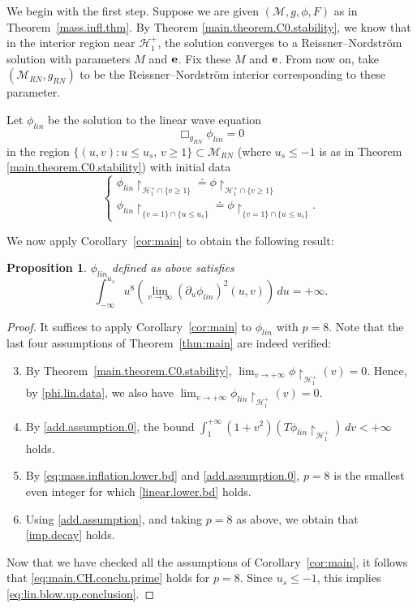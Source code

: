 \documentclass[10pt, reqno]{amsart}
\newtheorem{proposition}[theorem]{Proposition}
\theoremstyle{definition}
\theoremstyle{remark}
\numberwithin{equation}{section}
\newcommand{\rd}{\partial}
\newcommand{\0}{\emptyset}
\newcommand{\calH}{\mathcal H}
\newcommand{\EH}{\calH^{+}}
\begin{document}
We begin with the first step. Suppose we are given $(\mathcal M, g, \phi, F)$ as in Theorem~\ref{mass.infl.thm}. By Theorem \ref{main.theorem.C0.stability}, we know that in the interior region near $\EH_1$, the solution converges to a Reissner--Nordstr\"om solution with parameters $M$ and ${\bf e}$. Fix these $M$ and ${\bf e}$. From now on, take $(\mathcal M_{RN}, g_{RN})$ to be the Reissner--Nordstr\"om interior corresponding to these parameter.

Let $\phi_{lin}$ be the solution to the linear wave equation 
\begin{equation}\label{eq:phi.lin.wave}
\Box_{g_{RN}}\phi_{lin}=0
\end{equation}
in the region $\{(u,v): u\leq u_s,\,v\geq 1\}\subset \mathcal M_{RN}$ (where $u_s\leq -1$ is as in Theorem \ref{main.theorem.C0.stability}) with initial data 
\begin{equation}\label{phi.lin.data}
\begin{cases}
\phi_{lin}\restriction_{\EH_1\cap \{v\geq 1\}} \doteq \phi\restriction_{\EH_1 \cap \{v\geq 1\}}\\
\phi_{lin}\restriction_{\{v=1\}\cap \{u\leq u_s\}} \doteq \phi\restriction_{\{v=1\}\cap \{u\leq u_s\}}.
\end{cases}
\end{equation}



We now apply Corollary~\ref{cor:main} to obtain the following result:
\begin{proposition}\label{lin.blow.up}
$\phi_{lin}$ defined as above satisfies 
\begin{equation}\label{eq:lin.blow.up.conclusion}
\int_{-\infty}^{u_s} u^8 \left(\lim_{v\to\infty} (\rd_u\phi_{lin})^2 (u,v)\right)\, du = +\infty.
\end{equation}
\end{proposition}
\begin{proof}
It suffices to apply Corollary~\ref{cor:main} to $\phi_{lin}$ with $p = 8$. Note that the last four assumptions of Theorem~\ref{thm:main} are indeed verified: 
\begin{enumerate}\setcounter{enumi}{2}
\item By Theorem~\ref{main.theorem.C0.stability}, $\lim_{v\to +\infty} \phi\restriction_{\EH_1}(v) = 0$. Hence, by \eqref{phi.lin.data}, we also have $\lim_{v\to +\infty} \phi_{lin}\restriction_{\EH_1}(v) = 0$.
\item By \eqref{add.assumption.0}, the bound $\int_1^{+\infty} (1+v^2) (T\phi_{lin}\restriction_{\EH_1}) \, dv <+\infty$ holds.
\item By \eqref{eq:mass.inflation.lower.bd} and \eqref{add.assumption.0}, $p = 8$ is the smallest even integer for which \eqref{linear.lower.bd} holds.
\item Using \eqref{add.assumption}, and taking $p=8$ as above, we obtain that \eqref{imp.decay} holds.
\end{enumerate}

Now that we have checked all the assumptions of Corollary~\ref{cor:main}, it follows that \eqref{eq:main.CH.conclu.prime} holds for $p =8$. Since $u_s \leq -1$, this implies \eqref{eq:lin.blow.up.conclusion}. \qedhere
\end{proof}
\end{document}
